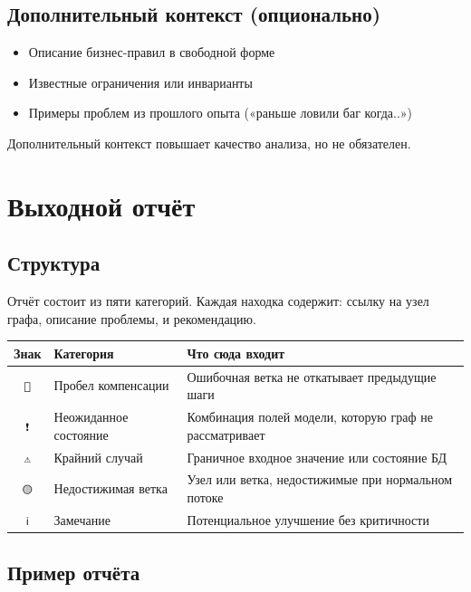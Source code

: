 \documentclass[11pt, a4paper, oneside]{article}
\begin{document}
\subsection{Дополнительный контекст (опционально)}

\begin{itemize}
  \item Описание бизнес-правил в свободной форме
  \item Известные ограничения или инварианты
  \item Примеры проблем из прошлого опыта («раньше ловили баг когда..»)
\end{itemize}

Дополнительный контекст повышает качество анализа, но не обязателен.

\section{Выходной отчёт}

\subsection{Структура}

Отчёт состоит из пяти категорий. Каждая находка содержит:
ссылку на узел графа, описание проблемы, и рекомендацию.

\begin{center}
\begin{tabularx}{\textwidth}{cLL}
  \toprule
  \textbf{Знак} & \textbf{Категория} & \textbf{Что сюда входит} \\
  \midrule
  \texttt{🔴} & Пробел компенсации
    & Ошибочная ветка не откатывает предыдущие шаги \\
  \texttt{❗} & Неожиданное состояние
    & Комбинация полей модели, которую граф не рассматривает \\
  \texttt{⚠️} & Крайний случай
    & Граничное входное значение или состояние БД \\
  \texttt{🟡} & Недостижимая ветка
    & Узел или ветка, недостижимые при нормальном потоке \\
  \texttt{ℹ️} & Замечание
    & Потенциальное улучшение без критичности \\
  \bottomrule
\end{tabularx}
\end{center}

\subsection{Пример отчёта}
\end{document}
